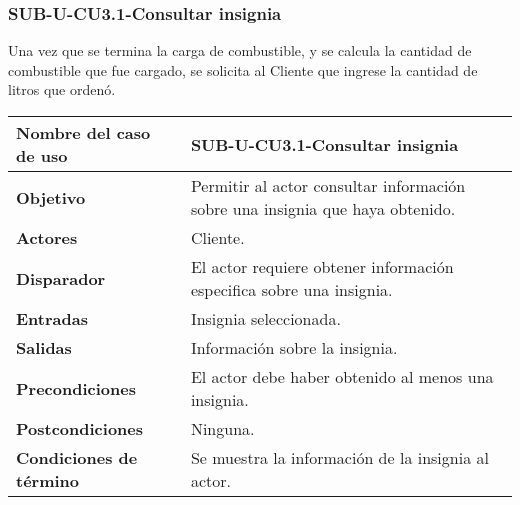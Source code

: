 \subsubsection{SUB-U-CU3.1-Consultar insignia}\label{SUB-U-CU3.1}
Una vez que se termina la carga de combustible, y se calcula la cantidad de combustible que fue cargado, se solicita al Cliente que ingrese la cantidad de litros que ordenó.

\begin{longtable}{|J{5cm}|J{10.3cm}|}
	\hline
	\textbf{Nombre del caso de uso} &
		SUB-U-CU3.1-Consultar insignia \\ \hline
	\textbf{Objetivo} &
		Permitir al actor consultar información sobre una insignia que haya obtenido. \\ \hline
	\textbf{Actores} &
		Cliente. \\ \hline 
	\textbf{Disparador} & 
		El actor requiere obtener información especifica sobre una insignia.\\ \hline 
	\textbf{Entradas} & Insignia seleccionada.
		\\ \hline 
	\textbf{Salidas} & Información sobre la insignia.
		\\ \hline
	\textbf{Precondiciones} &
		El actor debe haber obtenido al menos una insignia.\\ \hline
	\textbf{Postcondiciones} & Ninguna.
		\\ \hline
	\textbf{Condiciones de término} & Se muestra la información de la insignia al actor.

\end{longtable}
